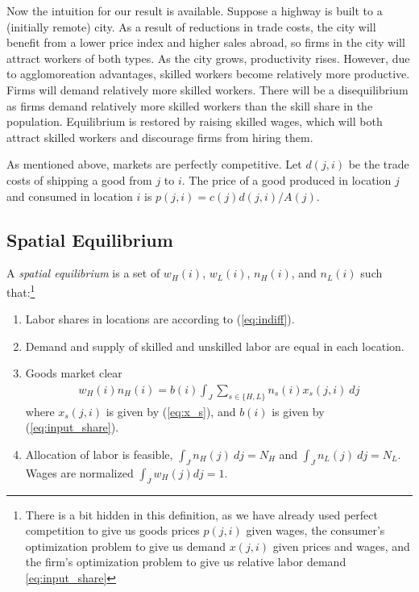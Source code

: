 \documentclass[12 pt]{article}
\begin{document}
Now the intuition for our result is available.  Suppose a highway is built to a (initially remote) city. As a result of reductions in trade costs, the city will benefit from a lower price index and higher sales abroad, so firms in the city will attract workers of both types.  As the city grows, productivity rises. However, due to agglomoreation advantages, skilled workers become relatively more productive.  Firms will demand relatively more skilled workers.  There will be a disequilibrium as firms demand relatively more skilled workers than the skill share in the population.  Equilibrium is restored by raising skilled wages, which will both attract skilled workers and discourage firms from hiring them.

As mentioned above, markets are perfectly competitive. Let $d(j,i)$ be the trade costs of shipping a good from $j$ to $i$. The price of a good produced in location $j$ and consumed in location $i$ is $p(j,i) = c(j)d(j,i)/A(j)$. 

\subsection{Spatial Equilibrium}

A \textit{spatial equilibrium} is a set of $w_H(i)$, $w_L(i)$, $n_H(i)$, and $n_L(i)$ such that:\footnote{There is a bit hidden in this definition, as we have already used perfect competition to give us goods prices $p(j,i)$ given wages, the consumer's optimization problem to give us demand $x(j,i)$ given prices and wages, and the firm's optimization problem to give us relative labor demand \eqref{eq:input_share}}
\begin{enumerate}
\item Labor shares in locations are according to (\ref{eq:indiff}).
\item Demand and supply of skilled and unskilled labor are equal in each location.
\item Goods market clear
\begin{eqnarray}\label{eq:goods_mkt_clear}
	w_H(i) n_H(i) =  b(i) \int_J \sum_{s \in \{H,L\}} n_s(i)x_s(j,i) ~dj 
\end{eqnarray}
where $x_s(j,i)$ is given by (\ref{eq:x_s}), and $b(i)$ is given by (\ref{eq:input_share}).
\item Allocation of labor is feasible, $\int_J n_H(j) ~dj = N_H$ and $\int_J n_L(j) ~dj = N_L$. Wages are normalized $\int_J w_H(j) dj =1$.
\end{enumerate}
\end{document}

